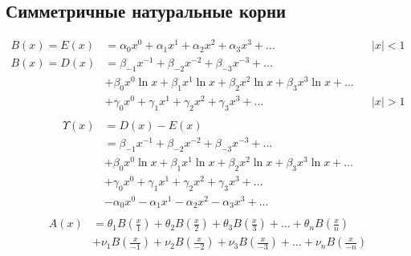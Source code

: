 
\subsection{Симметричные натуральные корни}

\begin{equation*} \begin{aligned}
B(x) = E(x) &=
  \alpha_0 x^0
+ \alpha_1 x^1
+ \alpha_2 x^2
+ \alpha_3 x^3
+ \ldots &
&|x| < 1 \\
%
B(x) = D(x) &=   
  \beta_{-1} x^{-1}
+ \beta_{-2} x^{-2}
+ \beta_{-3} x^{-3}
+ \ldots \\ &
+ \beta_0 x^0 \ln{x}
+ \beta_1 x^1 \ln{x}
+ \beta_2 x^2 \ln{x}
+ \beta_3 x^3 \ln{x}
+ \ldots \\ &
+ \gamma_0 x^0
+ \gamma_1 x^1
+ \gamma_2 x^2
+ \gamma_3 x^3
+ \ldots &
&|x| > 1 \\
\end{aligned} \end{equation*}
%
\begin{equation*} \begin{aligned}
\Upsilon(x) &= D(x) - E(x) \\ &=
  \beta_{-1} x^{-1}
+ \beta_{-2} x^{-2}
+ \beta_{-3} x^{-3}
+ \ldots \\ &
+ \beta_0 x^0 \ln{x}
+ \beta_1 x^1 \ln{x}
+ \beta_2 x^2 \ln{x}
+ \beta_3 x^3 \ln{x}
+ \ldots \\ &
+ \gamma_0 x^0
+ \gamma_1 x^1
+ \gamma_2 x^2
+ \gamma_3 x^3
+ \ldots \\ &
- \alpha_0 x^0
- \alpha_1 x^1
- \alpha_2 x^2
- \alpha_3 x^3
+ \ldots \\
\end{aligned} \end{equation*}
%
\begin{equation*} \begin{aligned}
A(x) &=
  \theta_1 B{\left(\frac{x}{1} \right)}
+ \theta_2 B{\left(\frac{x}{2} \right)}
+ \theta_3 B{\left(\frac{x}{3} \right)}
+ \ldots
+ \theta_n B{\left(\frac{x}{n} \right)} \\ &
+ \nu_1 B{\left(\frac{x}{- 1} \right)}
+ \nu_2 B{\left(\frac{x}{- 2} \right)}
+ \nu_3 B{\left(\frac{x}{- 3} \right)}
+ \ldots
+ \nu_n B{\left(\frac{x}{- n} \right)} \\
\end{aligned} \end{equation*}

